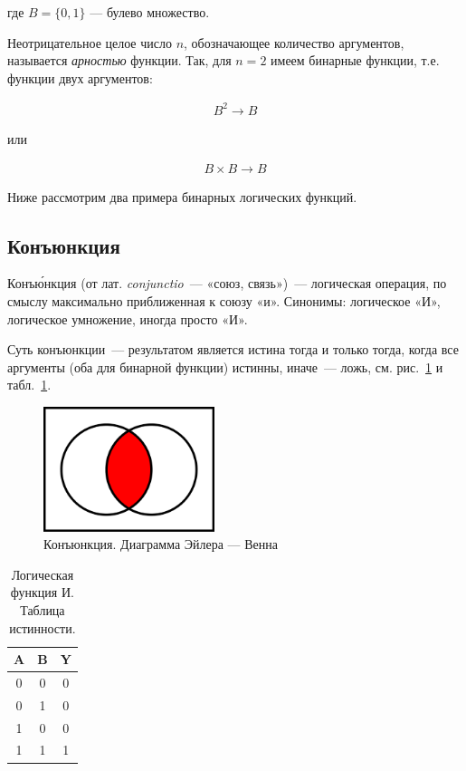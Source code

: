 \documentclass[a4paper,12pt]{article}
\begin{document}
где $B = \{0,1\}$ — булево множество. 

Неотрицательное целое число $n$, обозначающее количество аргументов, называется \textit{арностью} функции. Так, для $n = 2$ имеем бинарные функции, т.е. функции двух аргументов:

\begin{align}\label{eq:B2B}
 B^2 \rightarrow B
\end{align}

или

\begin{align}\label{eq:BBB}
B \times B \rightarrow B
\end{align}

Ниже рассмотрим два примера бинарных логических функций.

\subsection{Конъюнкция}

Конъ\'{ю}нкция (от лат. \textit{conjunctio}~--- «союз, связь»)~--- логическая операция, по смыслу максимально приближенная к союзу «и». Синонимы: логическое «И», логическое умножение, иногда просто «И».

Суть конъюнкции~--- результатом является истина тогда и только тогда, когда все аргументы (оба для бинарной функции) истинны, иначе~--- ложь, см. рис.~\ref{and} и табл.~\ref{AND_table}.

\begin{figure}[h]
    \begin{center}
    \includegraphics[width=5cm]{and}    
    \caption{Конъюнкция. Диаграмма Эйлера — Венна}
    \label{and}
    \end{center}
\end{figure}


\begin{table}[h!]
    \caption{Логическая функция И. Таблица истинности.\label{AND_table}}
    \begin{center}
    \begin{tabular}{||c c c||} 
     \hline
     A & B & Y \\ [0.5ex] 
     \hline\hline
     0 & 0 & 0 \\ 
     \hline
     0 & 1 & 0 \\
     \hline
     1 & 0 & 0 \\
     \hline
     1 & 1 & 1 \\ 
     \hline
    \end{tabular}
    \end{center}
\end{table}
\end{document}
